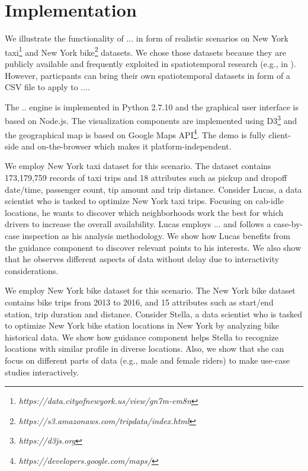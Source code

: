 \documentclass[runningheads,a4paper]{llncs}
\begin{document}
\vspace{-5pt}
\section{Implementation}

 We illustrate the functionality of ... in form of realistic scenarios on New York taxi\footnote{\it https://data.cityofnewyork.us/view/gn7m-em8n} and New York bike\footnote{\it https://s3.amazonaws.com/tripdata/index.html} datasets. We chose those datasets because they are publicly available and frequently exploited in spatiotemporal research (e.g., in \cite{DBLP:journals/debu/FreireCVZ16}). However, particpants can bring their own spatiotemporal datasets in form of a CSV file to apply to ....

 The .. engine is implemented in Python 2.7.10 and the graphical user interface is based on Node.js. The visualization components are implemented using {\sc D3}\footnote{\it https://d3js.org} and the geographical map is based on {\sc Google Maps API}\footnote{\it https://developers.google.com/maps/}. The demo is fully client-side and on-the-browser which makes it platform-independent. 

 We employ New York taxi dataset for this scenario. The  dataset contains 173,179,759 records of taxi trips and 18 attributes such as pickup and dropoff date/time, passenger count, tip amount and trip distance. Consider Lucas, a data scientist who is tasked to optimize New York taxi trips. Focusing on cab-idle locations, he wants to discover which neighborhoods work the best for which drivers to increase the overall availability. Lucas employs ... and follows a case-by-case inspection as his analysis methodology. We show how Lucas benefits from the guidance component to discover relevant points to his interests. We also show that he observes different aspects of data without delay due to interactivity considerations.

 We employ New York bike dataset for this scenario. The New York bike dataset contains bike trips from 2013 to 2016, and 15 attributes such as start/end station, trip duration and distance. Consider Stella, a data scientist who is tasked to optimize New York bike station locations in New York by analyzing bike historical data. We show how guidance component helps Stella to recognize locations with similar profile in diverse locations. Also, we show that she can focus on different parts of data (e.g., male and female riders) to make use-case studies interactively.
\end{document}
